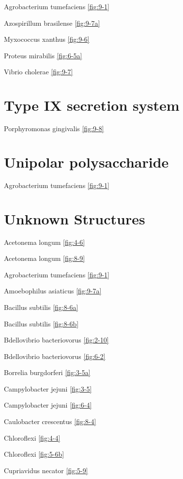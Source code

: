 \documentclass[]{tufte-book}
\begin{document}
Agrobacterium tumefaciens \ref{fig:9-1}

Azospirillum brasilense \ref{fig:9-7a}

Myxococcus xanthus \ref{fig:9-6}

Proteus mirabilis \ref{fig:6-5a}

Vibrio cholerae \ref{fig:9-7}

\section*{Type IX secretion system}\label{type-ix-secretion-system}

Porphyromonas gingivalis \ref{fig:9-8}

\section*{Unipolar polysaccharide}\label{unipolar-polysaccharide}

Agrobacterium tumefaciens \ref{fig:9-1}

\section*{Unknown Structures}\label{unknown-structures}

Acetonema longum \ref{fig:4-6}

Acetonema longum \ref{fig:8-9}

Agrobacterium tumefaciens \ref{fig:9-1}

Amoebophilus asiaticus \ref{fig:9-7a}

Bacillus subtilis \ref{fig:8-6a}

Bacillus subtilis \ref{fig:8-6b}

Bdellovibrio bacteriovorus \ref{fig:2-10}

Bdellovibrio bacteriovorus \ref{fig:6-2}

Borrelia burgdorferi \ref{fig:3-5a}

Campylobacter jejuni \ref{fig:3-5}

Campylobacter jejuni \ref{fig:6-4}

Caulobacter crescentus \ref{fig:8-4}

Chloroflexi \ref{fig:4-4}

Chloroflexi \ref{fig:5-6b}

Cupriavidus necator \ref{fig:5-9}
\end{document}
